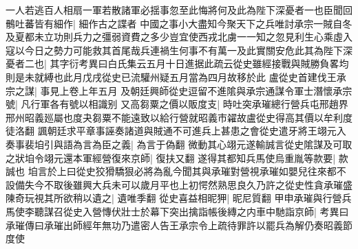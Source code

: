 一人若逃百人相扇一軍若散諸軍必揺事忽至此悔將何及此為陛下深憂者一也臣聞回鶻吐蕃皆有細作|{
	細作古之諜者}
中國之事小大盡知今聚天下之兵唯討承宗一賊自冬及夏都未立功則兵力之彊弱資費之多少豈宜使西戎北虜一一知之忽見利生心乘虛入寇以今日之勢力可能救其首尾哉兵連禍生何事不有萬一及此實關安危此其為陛下深憂者二也|{
	其字衍考異曰白氏集云五月十日進据此疏云從史雖經接戰與賊勝負畧均則是未就縛也此月戊戌從史已流驩州疑五月當為四月故移於此}
盧從史首建伐王承宗之謀|{
	事見上卷上年五月}
及朝廷興師從史逗留不進隂與承宗通謀令軍士潛懷承宗號|{
	凡行軍各有號以相識别}
又高芻粟之價以販度支|{
	時吐突承璀總行營兵屯邢趙界邢州昭義廵屬也度夬芻粟不能遠致以給行營就昭義市糴故盧從史得高其價以牟利度徒洛翻}
諷朝廷求平章事誣奏諸道與賊通不可進兵上甚患之會從史遣牙將王翊元入奏事裴垍引與語為言為臣之義|{
	為言于偽翻}
微動其心翊元遂輸誠言從史隂謀及可取之狀垍令翊元還本軍經營復來京師|{
	復扶又翻}
遂得其都知兵馬使烏重胤等款要|{
	款誠也}
垍言於上曰從史狡猾驕狠必將為亂今聞其與承璀對營視承璀如嬰兒往來都不設備失今不取後雖興大兵未可以歲月平也上初愕然熟思良久乃許之從史性貪承璀盛陳奇玩視其所欲稍以遺之|{
	遺唯季翻}
從史喜益相昵狎|{
	昵尼質翻}
甲申承璀與行營兵馬使李聽謀召從史入營慱伏壯士於幕下突出擒詣帳後縳之内車中馳詣京師|{
	考異曰承璀傳曰承璀出師經年無功乃遣密人告王承宗令上疏待罪許以罷兵為解仍奏昭義節度使}



